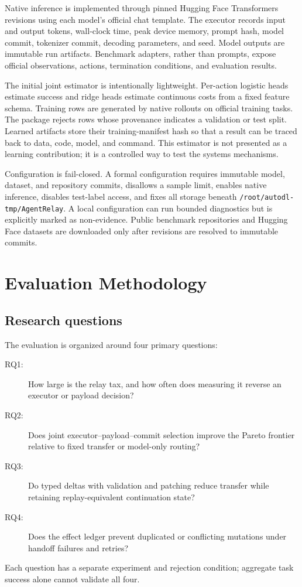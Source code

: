 \documentclass[10pt]{article}
\begin{document}
Native inference is implemented through pinned Hugging Face Transformers
revisions using each model's official chat template. The executor records
input and output tokens, wall-clock time, peak device memory, prompt hash,
model commit, tokenizer commit, decoding parameters, and seed. Model outputs
are immutable run artifacts. Benchmark adapters, rather than prompts, expose
official observations, actions, termination conditions, and evaluation
results.

The initial joint estimator is intentionally lightweight. Per-action logistic
heads estimate success and ridge heads estimate continuous costs from a fixed
feature schema. Training rows are generated by native rollouts on official
training tasks. The package rejects rows whose provenance indicates a
validation or test split. Learned artifacts store their training-manifest
hash so that a result can be traced back to data, code, model, and command.
This estimator is not presented as a learning contribution; it is a controlled
way to test the systems mechanisms.

Configuration is fail-closed. A formal configuration requires immutable model,
dataset, and repository commits, disallows a sample limit, enables native
inference, disables test-label access, and fixes all storage beneath
\texttt{/root/autodl-tmp/AgentRelay}. A local configuration can run bounded
diagnostics but is explicitly marked as non-evidence. Public benchmark
repositories and Hugging Face datasets are downloaded only after revisions
are resolved to immutable commits.

\section{Evaluation Methodology}
\label{sec:evaluation}

\subsection{Research questions}

The evaluation is organized around four primary questions:
\begin{description}
  \item[RQ1:] How large is the relay tax, and how often does measuring it
  reverse an executor or payload decision?
  \item[RQ2:] Does joint executor--payload--commit selection improve the
  Pareto frontier relative to fixed transfer or model-only routing?
  \item[RQ3:] Do typed deltas with validation and patching reduce transfer
  while retaining replay-equivalent continuation state?
  \item[RQ4:] Does the effect ledger prevent duplicated or conflicting
  mutations under handoff failures and retries?
\end{description}
Each question has a separate experiment and rejection condition; aggregate
task success alone cannot validate all four.
\end{document}
